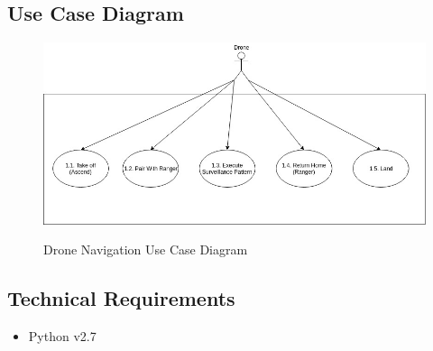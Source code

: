 \subsection{Use Case Diagram}
\begin{center}
	\begin{flushleft}
		\begin{figure}[h!]
			\centering
			\includegraphics[scale=0.5]{./assets/images/navigation-ucd.jpg}
			\label{fig: object-recognition-ucd }
			\caption{Drone Navigation Use Case Diagram}
		\end{figure}

	\end{flushleft}
\end{center}

\subsection{Technical Requirements}
	\begin{flushleft}
		\begin{itemize}
				\item Python v2.7 
		\end{itemize}
	\end{flushleft}

